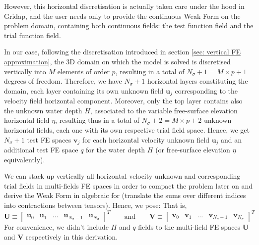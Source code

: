 \documentclass{article}
\newcommand{\Ns}{N_\sigma}
\newcommand{\uj}{\mathbf{u}_j}
\begin{document}
However, this horizontal discretisation is actually taken care under the hood in Gridap, and the user needs only to provide the continuous Weak Form on the problem domain, containing both continuous fields: the test function field and the trial function field. 

In our case, following the discretisation introduced in section \ref{sec: vertical FE approximation}, the 3D domain on which the model is solved is discretised vertically into $M$ elements of order $p$, resulting in a total of $\Ns +1 = M\times p +1$ degrees of freedom.
Therefore, we have $\Ns+1$ horizontal layers constituting the domain, each layer containing its own unknown field $\uj$ corresponding to the velocity field horizontal component. 
Moreover, only the top layer contains also the unknown water depth $H$, associated to the variable free-surface elevation horizontal field $\eta$, resulting thus in a total of $\Ns+2 = M\times p +2$ unknown horizontal fields, each one with its own respective trial field space.
Hence, we get $\Ns+1$ test FE spaces $\mathbf{v}_j$ for each horizontal velocity unknown field $\uj$ and an additional test FE space $q$ for the water depth $H$ (or free-surface elevation $\eta$ equivalently).

We can stack up vertically all horizontal velocity unknown and corresponding trial fields in multi-fields FE spaces in order to compact the problem later on and derive the Weak Form in algebraic for (translate the sums over different indices into contractions between tensors). 
Hence, we pose:
That is, 
\begin{equation}
    \mathbf{U} \equiv \begin{bmatrix}
        \mathbf{u}_0 & \mathbf{u}_1 & \dots & \mathbf{u}_{\Ns-1} & \mathbf{u}_{\Ns} 
    \end{bmatrix}^T \qquad  \text{and} \qquad \mathbf{V} \equiv \begin{bmatrix}
        \mathbf{v}_0 & \mathbf{v}_1 & \dots & \mathbf{v}_{\Ns-1} & \mathbf{v}_{\Ns}
    \end{bmatrix}^T
    \label{eq: def U and V horizontal velocity multifield FE spaces}
\end{equation}
For convenience, we didn't include $H$ and $q$ fields to the multi-field FE spaces $\mathbf{U}$ and $\mathbf{V}$ respectively in this derivation.
\end{document}
